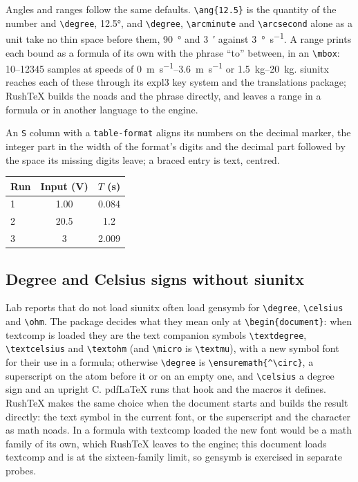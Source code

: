 \documentclass{article}
\numberwithin{equation}{section}
\theoremstyle{definition}
\theoremstyle{remark}
\begin{document}
Angles and ranges follow the same defaults. \verb|\ang{12.5}| is the quantity of the
number and \verb|\degree|, \ang{12.5}, and \verb|\degree|, \verb|\arcminute| and
\verb|\arcsecond| alone as a unit take no thin space before them, \SI{90}{\degree} and
\SI{3}{\arcminute} against \SI{3}{\degree\per\second}. A range prints each bound as a
formula of its own with the phrase ``to'' between, in an \verb|\mbox|:
\numrange{10}{12345} samples at speeds of \SIrange{0}{3.6}{\meter\per\second} or
\qtyrange{1.5}{20}{\kilo\gram}. siunitx reaches each of these through its expl3 key
system and the translations package; RushTeX builds the noads and the phrase directly,
and leaves a range in a formula or in another language to the engine.

An \texttt{S} column with a \texttt{table-format} aligns its numbers on the decimal marker,
the integer part in the width of the format's digits and the decimal part followed by the
space its missing digits leave; a braced entry is text, centred.
\begin{center}
\begin{tabular}{@{}l S[table-format=2.2] S[table-format=1.3]@{}}
\toprule
Run & {Input (\si{\volt})} & {$T$ (\si{\second})}\\
 & 1.00 & 0.084\\
2 & 20.5 & 1.2\\
3 & 3 & 2.009\\
\bottomrule
\end{tabular}
\end{center}

\subsection{Degree and Celsius signs without siunitx}\label{sec:gensymb}
Lab reports that do not load siunitx often load gensymb for \verb|\degree|, \verb|\celsius|
and \verb|\ohm|. The package decides what they mean only at \verb|\begin{document}|: when
textcomp is loaded they are the text companion symbols \verb|\textdegree|,
\verb|\textcelsius| and \verb|\textohm| (and \verb|\micro| is \verb|\textmu|), with a new
symbol font for their use in a formula; otherwise \verb|\degree| is
\verb|\ensuremath{^\circ}|, a superscript on the atom before it or on an empty one, and
\verb|\celsius| a degree sign and an upright C. pdfLaTeX runs that hook and the macros it
defines. RushTeX makes the same choice when the document starts and builds the result
directly: the text symbol in the current font, or the superscript and the character as
math noads. In a formula with textcomp loaded the new font would be a math family of its
own, which RushTeX leaves to the engine; this document loads textcomp and is at the
sixteen-family limit, so gensymb is exercised in separate probes.
\end{document}
